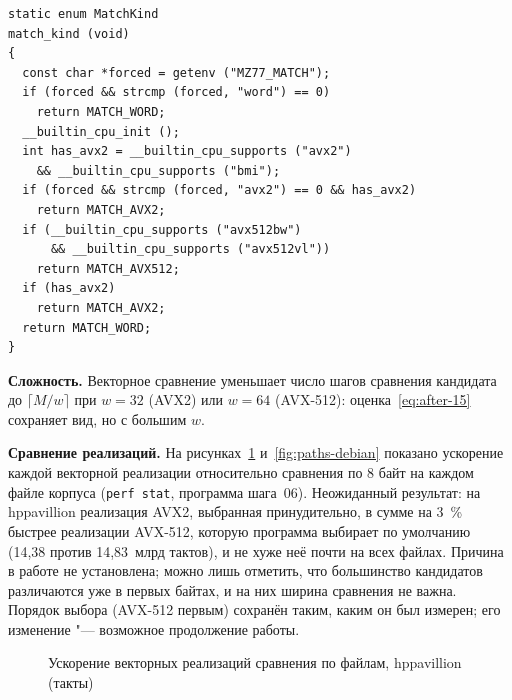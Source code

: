\begin{lstlisting}[caption={Выбор реализации сравнения},label={lst:dispatch}]
static enum MatchKind
match_kind (void)
{
  const char *forced = getenv ("MZ77_MATCH");
  if (forced && strcmp (forced, "word") == 0)
    return MATCH_WORD;
  __builtin_cpu_init ();
  int has_avx2 = __builtin_cpu_supports ("avx2")
    && __builtin_cpu_supports ("bmi");
  if (forced && strcmp (forced, "avx2") == 0 && has_avx2)
    return MATCH_AVX2;
  if (__builtin_cpu_supports ("avx512bw")
      && __builtin_cpu_supports ("avx512vl"))
    return MATCH_AVX512;
  if (has_avx2)
    return MATCH_AVX2;
  return MATCH_WORD;
}
\end{lstlisting}

\textbf{Сложность.} Векторное сравнение уменьшает число шагов сравнения
кандидата до $\lceil M/w \rceil$ при $w = 32$ (AVX2) или $w = 64$
(AVX-512): оценка~\eqref{eq:after-15} сохраняет вид, но с большим $w$.

\textbf{Сравнение реализаций.} На рисунках~\ref{fig:paths-hpp}
и~\ref{fig:paths-debian} показано ускорение каждой векторной реализации
относительно сравнения по 8 байт на каждом файле корпуса
(\texttt{perf stat}, программа шага~06). Неожиданный результат: на
hppavillion реализация AVX2, выбранная принудительно, в сумме на 3~\%
быстрее реализации AVX-512, которую программа выбирает по умолчанию
(14,38 против 14,83~млрд тактов), и не хуже неё почти на всех файлах.
Причина в работе не установлена; можно лишь отметить, что большинство
кандидатов различаются уже в первых байтах, и на них ширина сравнения не
важна. Порядок выбора (AVX-512 первым) сохранён таким,
каким он был измерен; его изменение "--- возможное продолжение работы.

\begin{figure}[H]
\centering
{}
\caption{Ускорение векторных реализаций сравнения по файлам, hppavillion (такты)}
\label{fig:paths-hpp}
\end{figure}

